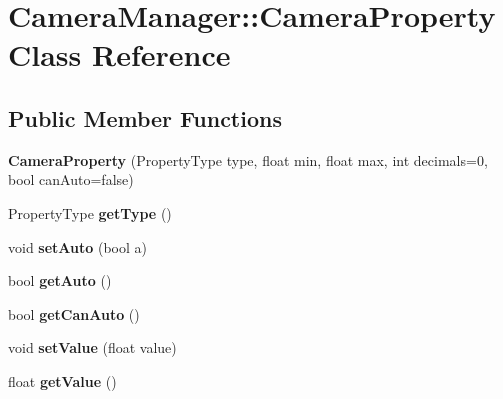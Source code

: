 \hypertarget{class_camera_manager_1_1_camera_property}{\section{Camera\-Manager\-:\-:Camera\-Property Class Reference}
\label{class_camera_manager_1_1_camera_property}
}
\subsection*{Public Member Functions}
\begin{DoxyCompactItemize}
\item 
\hypertarget{class_camera_manager_1_1_camera_property_aad0857fede2af9835a8199171972db23}{{\bfseries Camera\-Property} (Property\-Type type, float min, float max, int decimals=0, bool can\-Auto=false)}\label{class_camera_manager_1_1_camera_property_aad0857fede2af9835a8199171972db23}

\item 
\hypertarget{class_camera_manager_1_1_camera_property_abba29ee03832b7036f2d828223a5e26d}{Property\-Type {\bfseries get\-Type} ()}\label{class_camera_manager_1_1_camera_property_abba29ee03832b7036f2d828223a5e26d}

\item 
\hypertarget{class_camera_manager_1_1_camera_property_a3c86a53f13aff002234e1c2e7ba17e22}{void {\bfseries set\-Auto} (bool a)}\label{class_camera_manager_1_1_camera_property_a3c86a53f13aff002234e1c2e7ba17e22}

\item 
\hypertarget{class_camera_manager_1_1_camera_property_a09276d4af15cb3b6b282d75108eefc2c}{bool {\bfseries get\-Auto} ()}\label{class_camera_manager_1_1_camera_property_a09276d4af15cb3b6b282d75108eefc2c}

\item 
\hypertarget{class_camera_manager_1_1_camera_property_a79acdab6a37d6c8c07d2fc46cfee8067}{bool {\bfseries get\-Can\-Auto} ()}\label{class_camera_manager_1_1_camera_property_a79acdab6a37d6c8c07d2fc46cfee8067}

\item 
\hypertarget{class_camera_manager_1_1_camera_property_aabbcf30d6a190b57e87f9b5249a7614d}{void {\bfseries set\-Value} (float value)}\label{class_camera_manager_1_1_camera_property_aabbcf30d6a190b57e87f9b5249a7614d}

\item 
\hypertarget{class_camera_manager_1_1_camera_property_a17872df27362cca1a73455aedd894068}{float {\bfseries get\-Value} ()}\label{class_camera_manager_1_1_camera_property_a17872df27362cca1a73455aedd894068}


\end{DoxyCompactItemize}
